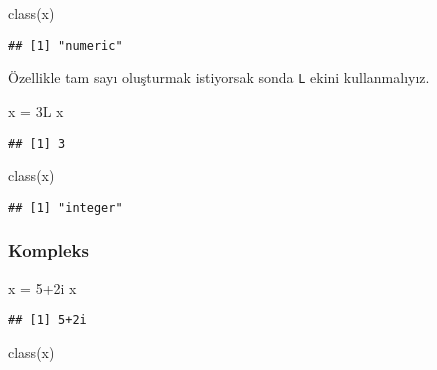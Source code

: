 \documentclass[
]{book}
\newenvironment{Shaded}{\begin{snugshade}}{\end{snugshade}}
\newcommand{\DecValTok}[1]{\textcolor[rgb]{0.00,0.00,0.81}{#1}}
\newcommand{\FunctionTok}[1]{\textcolor[rgb]{0.00,0.00,0.00}{#1}}
\newcommand{\NormalTok}[1]{#1}
\newcommand{\OtherTok}[1]{\textcolor[rgb]{0.56,0.35,0.01}{#1}}
\newcommand{\SpecialCharTok}[1]{\textcolor[rgb]{0.00,0.00,0.00}{#1}}
\begin{document}
\begin{Shaded}
\begin{Highlighting}[]
\FunctionTok{class}\NormalTok{(x)}
\end{Highlighting}
\end{Shaded}

\begin{verbatim}
## [1] "numeric"
\end{verbatim}

Özellikle tam sayı oluşturmak istiyorsak sonda \texttt{L} ekini kullanmalıyız.

\begin{Shaded}
\begin{Highlighting}[]
\NormalTok{x }\OtherTok{=}\NormalTok{ 3L}
\NormalTok{x}
\end{Highlighting}
\end{Shaded}

\begin{verbatim}
## [1] 3
\end{verbatim}

\begin{Shaded}
\begin{Highlighting}[]
\FunctionTok{class}\NormalTok{(x)}
\end{Highlighting}
\end{Shaded}

\begin{verbatim}
## [1] "integer"
\end{verbatim}

\hypertarget{kompleks}{%
\subsubsection{Kompleks}\label{kompleks}}

\begin{Shaded}
\begin{Highlighting}[]
\NormalTok{x }\OtherTok{=} \DecValTok{5}\SpecialCharTok{+}\NormalTok{2i}
\NormalTok{x}
\end{Highlighting}
\end{Shaded}

\begin{verbatim}
## [1] 5+2i
\end{verbatim}

\begin{Shaded}
\begin{Highlighting}[]
\FunctionTok{class}\NormalTok{(x)}
\end{Highlighting}
\end{Shaded}
\end{document}
